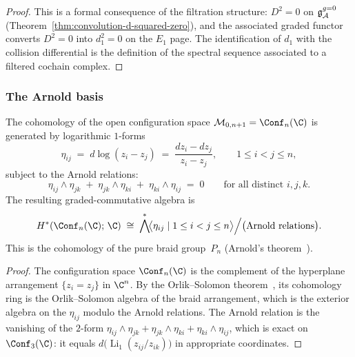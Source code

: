 \begin{proof}
This is a formal consequence of the filtration structure:
$D^2 = 0$ on $\mathfrak{g}^{g{=}0}_{\mathcal{A}}$
(Theorem~\ref{thm:convolution-d-squared-zero}), and the associated
graded functor converts $D^2 = 0$ into
$d_1^2 = 0$ on the $E_1$ page. The identification of
$d_1$ with the collision differential is the definition of the
spectral sequence associated to a filtered cochain complex.
\end{proof}


\subsubsection{The Arnold basis}

\begin{proposition}
\label{prop:thqg-V-arnold-cohomology}
The cohomology of the open configuration space
$\mathcal{M}_{0,n+1} = \Conf_n(\C)$ is generated by logarithmic
$1$-forms
\begin{equation}\label{eq:thqg-V-log-forms}
\eta_{ij}
\;=\;
d\log(z_i - z_j)
\;=\;
\frac{dz_i - dz_j}{z_i - z_j},
\qquad 1 \leq i < j \leq n,
\end{equation}
subject to the Arnold relations:
\begin{equation}\label{eq:thqg-V-arnold}
\eta_{ij} \wedge \eta_{jk}
\;+\;
\eta_{jk} \wedge \eta_{ki}
\;+\;
\eta_{ki} \wedge \eta_{ij}
\;=\; 0
\qquad
\text{for all distinct } i,j,k.
\end{equation}
The resulting graded-commutative algebra is
\begin{equation}\label{eq:thqg-V-arnold-algebra}
H^*(\Conf_n(\C);\,\C)
\;\cong\;
\bigwedge^*\!\bigl\langle \eta_{ij} \mid 1 \leq i < j \leq n
\bigr\rangle
\Big/
\bigl(\text{Arnold relations}\bigr).
\end{equation}
This is the cohomology of the pure braid group~$P_n$
\textup{(}Arnold's theorem~\cite{Arnold69}\textup{)}.
\end{proposition}

\begin{proof}
The configuration space $\Conf_n(\C)$ is the complement of the
hyperplane arrangement $\{z_i = z_j\}$ in $\C^n$. By the
Orlik--Solomon theorem~\cite{OrlSol80}, its cohomology ring is
the Orlik--Solomon algebra of the braid arrangement, which is the
exterior algebra on the $\eta_{ij}$ modulo the Arnold relations.
The Arnold relation is the vanishing of the $2$-form
$\eta_{ij} \wedge \eta_{jk} + \eta_{jk} \wedge \eta_{ki}
+ \eta_{ki} \wedge \eta_{ij}$, which is exact on $\Conf_3(\C)$:
it equals $d\bigl(\operatorname{Li}_1(z_{ij}/z_{ik})\bigr)$
in appropriate coordinates.
\end{proof}

